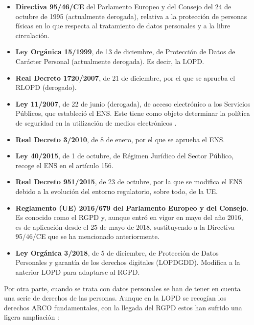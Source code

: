\begin{itemize}
    \item \textbf{Directiva 95/46/CE} del Parlamento Europeo y del Consejo del 24 de octubre de 1995 (actualmente derogada), relativa a la protección de personas físicas en lo que respecta al tratamiento de datos personales y a la libre circulación.
    
    \item \textbf{Ley Orgánica 15/1999}, de 13 de diciembre, de Protección de Datos de Carácter Personal (actualmente derogada). Es decir, la \acf{LOPD}.
    
    \item \textbf{Real Decreto 1720/2007}, de 21 de diciembre, por el que se aprueba el \acf{RLOPD} (derogado).
    
    \item \textbf{Ley 11/2007}, de 22 de junio (derogada), de acceso electrónico a los Servicios Públicos, que estableció el \acf{ENS}. Este tiene como objeto determinar la política de seguridad en la utilización de medios electrónicos \cite{ens}.
    
    \item \textbf{Real Decreto 3/2010}, de 8 de enero, por el que se aprueba el \acs{ENS}.
    
    \item \textbf{Ley 40/2015}, de 1 de octubre, de Régimen Jurídico del Sector Público, recoge el \acs{ENS} en el artículo 156.
    
    \item \textbf{Real Decreto 951/2015}, de 23 de octubre, por la que se modifica el \acs{ENS} debido a la evolución del entorno regulatorio, sobre todo, de la \acs{UE}.
    
    \item \textbf{Reglamento (\acs{UE}) 2016/679 del Parlamento Europeo y del Consejo}. Es conocido como el \acf{RGPD} y, aunque entró en vigor en mayo del año 2016, es de aplicación desde el 25 de mayo de 2018, sustituyendo a la Directiva 95/46/CE que se ha mencionado anteriormente.
    
    \item \textbf{Ley Orgánica 3/2018}, de 5 de diciembre, de Protección de Datos Personales y garantía de los derechos digitales (\acs{LOPDGDD}). Modifica a la anterior \acs{LOPD} para adaptarse al \acs{RGPD}.
\end{itemize}

Por otra parte, cuando se trata con datos personales se han de tener en cuenta una serie de derechos de las personas. Aunque en la \acs{LOPD} se recogían los derechos ARCO fundamentales, con la llegada del \acs{RGPD} estos han sufrido una ligera ampliación \cite{aepdderechos}:

